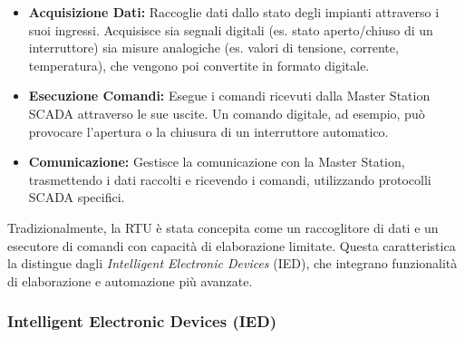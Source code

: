 \begin{itemize}
    \item \textbf{Acquisizione Dati:} Raccoglie dati dallo stato degli impianti attraverso i suoi ingressi. Acquisisce sia segnali digitali (es. stato aperto/chiuso di un interruttore) sia misure analogiche (es. valori di tensione, corrente, temperatura), che vengono poi convertite in formato digitale.
    \item \textbf{Esecuzione Comandi:} Esegue i comandi ricevuti dalla Master Station SCADA attraverso le sue uscite. Un comando digitale, ad esempio, può provocare l'apertura o la chiusura di un interruttore automatico.
    \item \textbf{Comunicazione:} Gestisce la comunicazione con la Master Station, trasmettendo i dati raccolti e ricevendo i comandi, utilizzando protocolli SCADA specifici.
\end{itemize}

Tradizionalmente, la RTU è stata concepita come un raccoglitore di dati e un esecutore di comandi con capacità di elaborazione limitate. Questa caratteristica la distingue dagli \textit{Intelligent Electronic Devices} (IED), che integrano funzionalità di elaborazione e automazione più avanzate.

\subsubsection{Intelligent Electronic Devices (IED)}





